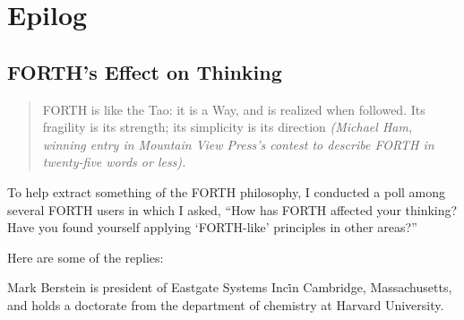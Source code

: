 \part{Epilog}
\chapter{
FORTH's Effect
on Thinking}
\begin{quote}
FORTH is like the Tao: it is a Way, and is realized when followed.  Its
fragility is its strength; its simplicity is its direction {\em (Michael Ham,
winning entry in Mountain View Press's contest to describe FORTH in twenty-five 
words or less).}
\end{quote}

To help extract something of the FORTH philosophy, I conducted a poll
among several FORTH users in which I asked, ``How has FORTH affected
your thinking?  Have you found yourself applying `FORTH-like' 
principles in other areas?''

Here are some of the replies:

Mark Berstein is president of Eastgate Systems Inc\. in Cambridge, 
Massachusetts, and holds a doctorate from the department of 
chemistry at Harvard University.

